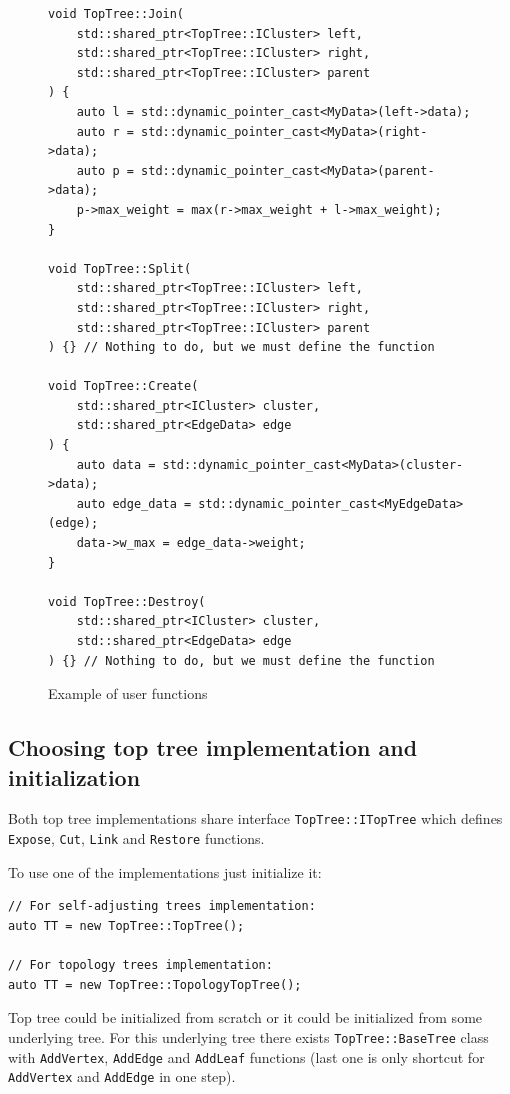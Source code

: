 \begin{figure}[H]
\begin{verbatim}
void TopTree::Join(
    std::shared_ptr<TopTree::ICluster> left,
    std::shared_ptr<TopTree::ICluster> right,
    std::shared_ptr<TopTree::ICluster> parent
) {
    auto l = std::dynamic_pointer_cast<MyData>(left->data);
    auto r = std::dynamic_pointer_cast<MyData>(right->data);
    auto p = std::dynamic_pointer_cast<MyData>(parent->data);
    p->max_weight = max(r->max_weight + l->max_weight);
}

void TopTree::Split(
    std::shared_ptr<TopTree::ICluster> left,
    std::shared_ptr<TopTree::ICluster> right,
    std::shared_ptr<TopTree::ICluster> parent
) {} // Nothing to do, but we must define the function

void TopTree::Create(
    std::shared_ptr<ICluster> cluster,
    std::shared_ptr<EdgeData> edge
) {
    auto data = std::dynamic_pointer_cast<MyData>(cluster->data);
    auto edge_data = std::dynamic_pointer_cast<MyEdgeData>(edge);
    data->w_max = edge_data->weight;
}

void TopTree::Destroy(
    std::shared_ptr<ICluster> cluster,
    std::shared_ptr<EdgeData> edge
) {} // Nothing to do, but we must define the function
\end{verbatim}
\caption{Example of user functions}
\end{figure}

\subsection{Choosing top tree implementation and initialization}

Both top tree implementations share interface \texttt{TopTree::ITopTree} which
defines \texttt{Expose}, \texttt{Cut}, \texttt{Link} and \texttt{Restore}
functions.

To use one of the implementations just initialize it:
\begin{verbatim}
// For self-adjusting trees implementation:
auto TT = new TopTree::TopTree();

// For topology trees implementation:
auto TT = new TopTree::TopologyTopTree();
\end{verbatim}

Top tree could be initialized from scratch or it could be initialized from
some underlying tree. For this underlying tree there exists
\texttt{TopTree::BaseTree} class with \texttt{AddVertex}, \texttt{AddEdge}
and \texttt{AddLeaf} functions (last one is only shortcut for \texttt{AddVertex}
and \texttt{AddEdge} in one step).

